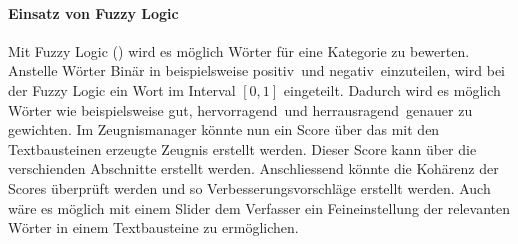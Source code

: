 \paragraph{Einsatz von Fuzzy Logic} Mit Fuzzy Logic (\cite{fuzzy_logic}) wird es möglich Wörter für eine Kategorie zu
bewerten. Anstelle Wörter Binär in beispielsweise \flqq positiv\frqq \ und \flqq negativ\frqq \ einzuteilen, wird bei
der Fuzzy Logic ein Wort im Interval $ [0,1] $ eingeteilt. Dadurch wird es möglich Wörter wie beispielsweise \flqq
gut\frqq, \flqq hervorragend\frqq \ und \flqq herrausragend\frqq \ genauer zu gewichten.
\newline
\newline
Im Zeugnismanager könnte nun ein Score über das mit den Textbausteinen erzeugte Zeugnis erstellt werden. Dieser Score
kann über die verschienden Abschnitte erstellt werden. Anschliessend könnte die Kohärenz der Scores überprüft werden und
so Verbesserungsvorschläge erstellt werden. Auch wäre es möglich mit einem Slider dem Verfasser ein Feineinstellung der
relevanten Wörter in einem Textbausteine zu ermöglichen.
